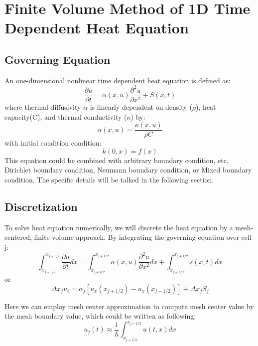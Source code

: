 
\cleardoublepage


\chapter{Finite Volume Method of 1D Time Dependent Heat Equation}

\section{Governing Equation}
An one-dimensional nonlinear time dependent heat equation is defined as:
\begin{equation}
\frac{\partial u}{\partial t} = \alpha(x,u) \frac{\partial^2 u}{\partial x^2} + S(x,t)
\end{equation}
where thermal diffusivity $\alpha$ is linearly dependent on density ($\rho$), heat capacity(C), and thermal conductivity ($\kappa$) by:
\begin{equation}
\alpha(x,u) = \frac{\kappa(x,u)}{\rho C}
\end{equation}
with initial condition condition:
\begin{equation}
k(0,x) = f(x) 
\end{equation}
This equation could be combined with arbitrary boundary condition, etc, Dirichlet boundary condition, Neumann boundary condition, or Mixed boundary condition. The specific details will be talked in the following section.

\section{Discretization}
To solve heat equation numerically, we will discrete the heat equation by a mesh-centered, finite-volume approach. By integrating the governing equation over cell j:
\begin{equation}
\int^{x_{j+1/2}}_{x_{j+1/2}} \frac{\partial u}{\partial t} dx =  \int^{x_{j+1/2}}_{x_{j+1/2}} \alpha(x,u) \frac{\partial^2 u}{\partial x^2} dx + \int^{x_{j+1/2}}_{x_{j+1/2}} s(x,t) dx
\end{equation}
or
\begin{equation}
\Delta x_j u_t = \alpha_j [ u_x(x_{j+1/2})- u_x(x_{j-1/2}) ] + \Delta x_j S_j
\end{equation}

Here we can employ mesh center approximation to compute mesh center value by the mesh boundary value, which could be written as following:
\begin{equation}
u_j(t) \approx \frac{1}{h} \int^{x_{j+1/2}}_{x_{j+1/2}} u(t,x) dx
\end{equation}

